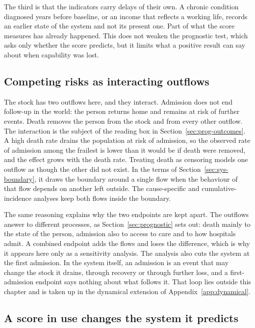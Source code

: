 The third is that the indicators carry delays of their own. A chronic condition diagnosed years before baseline, or an income that reflects a working life, records an earlier state of the system and not its present one. Part of what the score measures has already happened. This does not weaken the prognostic test, which asks only whether the score predicts, but it limits what a positive result can say about when capability was lost.

\subsection*{Competing risks as interacting outflows}

The stock has two outflows here, and they interact. Admission does not end follow-up in the world: the person returns home and remains at risk of further events. Death removes the person from the stock and from every other outflow. The interaction is the subject of the reading box in Section~\ref{sec:prog-outcomes}. A high death rate drains the population at risk of admission, so the observed rate of admission among the frailest is lower than it would be if death were removed, and the effect grows with the death rate. Treating death as censoring models one outflow as though the other did not exist. In the terms of Section~\ref{sec:sys-boundary}, it draws the boundary around a single flow when the behaviour of that flow depends on another left outside. The cause-specific and cumulative-incidence analyses keep both flows inside the boundary.

The same reasoning explains why the two endpoints are kept apart. The outflows answer to different processes, as Section~\ref{sec:prognostic} sets out: death mainly to the state of the person, admission also to access to care and to how hospitals admit. A combined endpoint adds the flows and loses the difference, which is why it appears here only as a sensitivity analysis. The analysis also cuts the system at the first admission. In the system itself, an admission is an event that may change the stock it drains, through recovery or through further loss, and a first-admission endpoint says nothing about what follows it. That loop lies outside this chapter and is taken up in the dynamical extension of Appendix~\ref{app:dynamical}.

\subsection*{A score in use changes the system it predicts}

